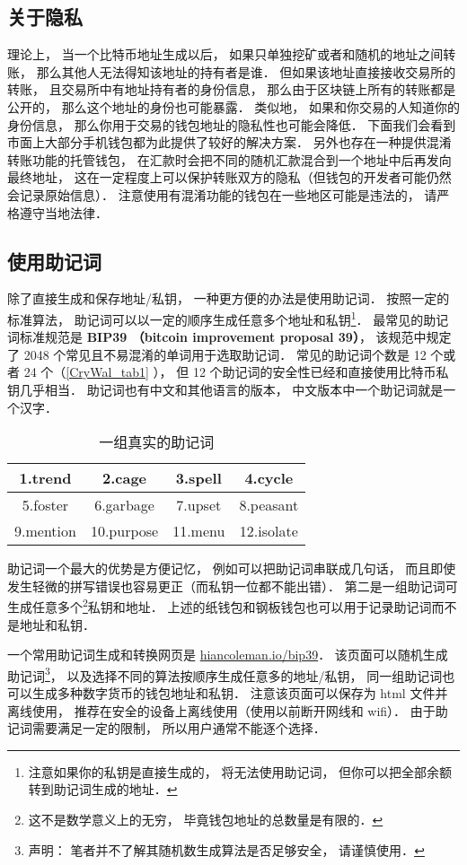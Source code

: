 \subsection{关于隐私}
理论上， 当一个比特币地址生成以后， 如果只单独挖矿或者和随机的地址之间转账， 那么其他人无法得知该地址的持有者是谁． 但如果该地址直接接收交易所的转账， 且交易所中有地址持有者的身份信息， 那么由于区块链上所有的转账都是公开的， 那么这个地址的身份也可能暴露． 类似地， 如果和你交易的人知道你的身份信息， 那么你用于交易的钱包地址的隐私性也可能会降低． 下面我们会看到市面上大部分手机钱包都为此提供了较好的解决方案． 另外也存在一种提供混淆转账功能的托管钱包， 在汇款时会把不同的随机汇款混合到一个地址中后再发向最终地址， 这在一定程度上可以保护转账双方的隐私（但钱包的开发者可能仍然会记录原始信息）． 注意使用有混淆功能的钱包在一些地区可能是违法的， 请严格遵守当地法律．

\subsection{使用助记词}
除了直接生成和保存地址/私钥， 一种更方便的办法是使用助记词． 按照一定的标准算法， 助记词可以以一定的顺序生成任意多个地址和私钥\footnote{注意如果你的私钥是直接生成的， 将无法使用助记词， 但你可以把全部余额转到助记词生成的地址．}． 最常见的助记词标准规范是 \textbf{BIP39 （bitcoin improvement proposal 39）}， 该规范中规定了 2048 个常见且不易混淆的单词用于选取助记词． 常见的助记词个数是 12 个或者 24 个（\autoref{CryWal_tab1} ）， 但 12 个助记词的安全性已经和直接使用比特币私钥几乎相当． 助记词也有中文和其他语言的版本， 中文版本中一个助记词就是一个汉字．
\begin{table}[ht]
\centering
\caption{一组真实的助记词}\label{CryWal_tab1}
\begin{tabular}{|c|c|c|c|}
\hline
1.trend & 2.cage & 3.spell & 4.cycle \\
\hline
5.foster & 6.garbage & 7.upset & 8.peasant \\
\hline
9.mention & 10.purpose & 11.menu & 12.isolate \\
\hline
\end{tabular}
\end{table}

助记词一个最大的优势是方便记忆， 例如可以把助记词串联成几句话， 而且即使发生轻微的拼写错误也容易更正（而私钥一位都不能出错）． 第二是一组助记词可生成任意多个\footnote{这不是数学意义上的无穷， 毕竟钱包地址的总数量是有限的．}私钥和地址． 上述的纸钱包和钢板钱包也可以用于记录助记词而不是地址和私钥．

一个常用助记词生成和转换网页是 \href{https://iancoleman.io/bip39/}{hiancoleman.io/bip39}． 该页面可以随机生成助记词\footnote{声明： 笔者并不了解其随机数生成算法是否足够安全， 请谨慎使用．}， 以及选择不同的算法按顺序生成任意多的地址/私钥， 同一组助记词也可以生成多种数字货币的钱包地址和私钥． 注意该页面可以保存为 html 文件并离线使用， 推荐在安全的设备上离线使用（使用以前断开网线和 wifi）． 由于助记词需要满足一定的限制， 所以用户通常不能逐个选择．

